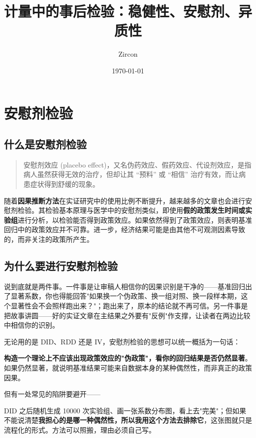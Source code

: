 \documentclass[11pt,a4paper]{ctexart}
\title{计量中的事后检验：稳健性、安慰剂、异质性}
\author{Zircon}
\date{\today}
\begin{document}
\maketitle
\tableofcontents
\newpage

\section{安慰剂检验}

\subsection{什么是安慰剂检验}

\begin{quote}
安慰剂效应 (placebo
effect)，又名伪药效应、假药效应、代设剂效应，是指病人虽然获得无效的治疗，但却让其
``预料'' 或 ``相信'' 治疗有效，而让病患症状得到舒缓的现象。
\end{quote}

随着\textbf{因果推断方法}在实证研究中的使用比例不断提升，越来越多的文章也会进行安慰剂检验。其检验基本原理与医学中的安慰剂类似，即使用\textbf{假的政策发生时间或实验组}进行分析，以检验能否得到政策效应。如果依然得到了政策效应，则表明基准回归中的政策效应并不可靠。进一步，经济结果可能是由其他不可观测因素导致的，而非关注的政策所产生。

\subsection{为什么要进行安慰剂检验}

说到底就是两件事。一件事是让审稿人相信你的因果识别是干净的——基准回归出了显著系数，你也得能回答"如果换一个伪政策、换一组对照、换一段样本期，这个显著性会不会照样跑出来？"；跑出来了，原本的结论就不再可信。另一件事是把故事讲圆——好的实证文章在主结果之外要有"反例"作支撑，让读者在两边比较中相信你的识别。

无论用的是 DID、RDD 还是 IV，安慰剂检验的思想可以统一概括为一句话：

\begin{concept}[核心思想]
\textbf{构造一个理论上不应该出现政策效应的"伪政策"，看你的回归结果是否仍然显著}。如果仍然显著，就说明基准结果可能来自数据本身的某种偶然性，而非真正的政策因果。
\end{concept}

但有一处常见的陷阱要避开——

\begin{pitfall}[避免"为安慰剂而安慰剂"]
DID 之后随机生成 10000 次实验组、画一张系数分布图，看上去"完美"；但如果不能说清楚\textbf{我担心的是哪一种偶然性，所以我用这个方法去排除它}，这张图就只是流程化的形式。方法可以照搬，理由必须自己写。
\end{pitfall}
\end{document}
